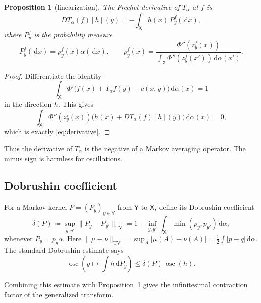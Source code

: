 \documentclass[11pt]{article}
\newtheorem{proposition}[theorem]{Proposition}
\newcommand{\X}{\mathsf{X}}
\newcommand{\Y}{\mathsf{Y}}
\newcommand{\dd}{\,\mathrm{d}}
\newcommand{\osc}{\operatorname{osc}}
\newcommand{\TV}{\operatorname{TV}}
\newcommand{\defeq}{\coloneqq}
\begin{document}
\begin{proposition}[linearization]\label{prop:derivative}
The Frechet derivative of $T_\alpha$ at $f$ is
\begin{equation}\label{eq:derivative}
  D T_\alpha(f)[h](y)
  =-
  \int_\X h(x)\,P_y^f(\dd x),
\end{equation}
where $P_y^f$ is the probability measure
\begin{equation}\label{eq:curvaturekernel}
  P_y^f(\dd x)
  =p_y^f(x)\alpha(\dd x),
  \qquad
  p_y^f(x)
  =
  \frac{\Phi''(z_y^f(x))}
       {\int_\X \Phi''(z_y^f(x'))\dd\alpha(x')}.
\end{equation}
\end{proposition}

\begin{proof}
Differentiate the identity
\begin{equation*}
  \int_\X \Phi'\big(f(x)+T_\alpha f(y)-c(x,y)\big)\dd\alpha(x)=1
\end{equation*}
in the direction $h$.  This gives
\begin{equation*}
  \int_\X \Phi''(z_y^f(x))
  \big(h(x)+D T_\alpha(f)[h](y)\big)\dd\alpha(x)=0,
\end{equation*}
which is exactly \eqref{eq:derivative}.
\end{proof}

Thus the derivative of $T_\alpha$ is the negative of a Markov averaging
operator.  The minus sign is harmless for oscillations.

\subsection{Dobrushin coefficient}

For a Markov kernel $P=(P_y)_{y\in\Y}$ from $\Y$ to $\X$, define its Dobrushin
coefficient
\begin{equation}\label{eq:dobrushin}
  \delta(P)
  \defeq
  \sup_{y,y'} \|P_y-P_{y'}\|_{\TV}
  =1-\inf_{y,y'}\int_\X \min(p_y,p_{y'})\dd\alpha,
\end{equation}
whenever $P_y=p_y\alpha$.  Here
$\|\mu-\nu\|_{\TV}=\sup_A|\mu(A)-\nu(A)|=\frac12\int |p-q|\dd\alpha$.
The standard Dobrushin estimate says
\begin{equation}\label{eq:dobrushin-est}
  \osc\left(y\mapsto \int h\dd P_y\right)
  \leq \delta(P)\,\osc(h).
\end{equation}

Combining this estimate with Proposition~\ref{prop:derivative} gives the
infinitesimal contraction factor of the generalized transform.
\end{document}
